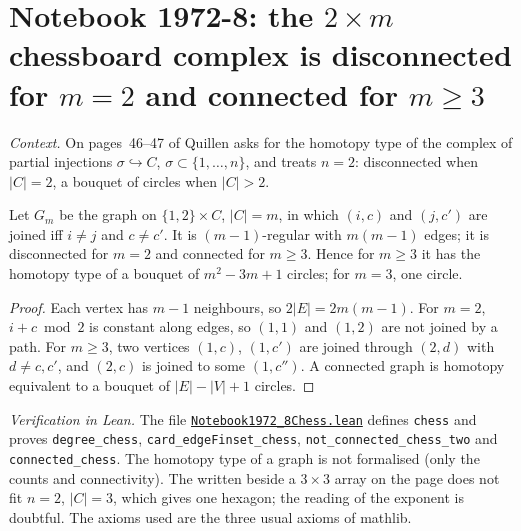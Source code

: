 \section[Notebook 1972-8: the $2 \times m$ chessboard complex]{Notebook 1972-8: the $2 \times m$ chessboard complex is disconnected for $m = 2$ and connected for $m \ge 3$\protect{}}\label{sec:quillen-1972-8-chess}

\emph{Context.} On pages~46--47 of  Quillen asks for the homotopy type of the complex of partial injections $\sigma \hookrightarrow C$, $\sigma \subset \{1, \dots, n\}$, and treats $n = 2$: disconnected when $|C| = 2$, a bouquet of circles when $|C| > 2$.

\begin{encadre}
\begin{theoreme}\label{thm:quillen-1972-8-chess}
Let $G_m$ be the graph on $\{1, 2\} \times C$, $|C| = m$, in which $(i, c)$ and $(j, c')$ are joined iff $i \ne j$ and $c \ne c'$. It is $(m - 1)$-regular with $m(m - 1)$ edges; it is disconnected for $m = 2$ and connected for $m \ge 3$. Hence for $m \ge 3$ it has the homotopy type of a bouquet of $m^2 - 3m + 1$ circles; for $m = 3$, one circle.
\end{theoreme}
\end{encadre}

\begin{proof}
Each vertex has $m - 1$ neighbours, so $2|E| = 2m(m - 1)$. For $m = 2$, $i + c \bmod 2$ is constant along edges, so $(1, 1)$ and $(1, 2)$ are not joined by a path. For $m \ge 3$, two vertices $(1, c)$, $(1, c')$ are joined through $(2, d)$ with $d \ne c, c'$, and $(2, c)$ is joined to some $(1, c'')$. A connected graph is homotopy equivalent to a bouquet of $|E| - |V| + 1$ circles.
\end{proof}

\emph{Verification in Lean.} The file \href{\leanblobmain/Notebook1972_8Chess.lean}{\texttt{Notebook1972\_8Chess.\allowbreak{}lean}} defines \texttt{chess} and proves \texttt{degree\_chess}, \texttt{card\_edgeFinset\_chess}, \texttt{not\_connected\_chess\_two} and \texttt{connected\_chess}. The homotopy type of a graph is not formalised (only the counts and connectivity). The  written beside a $3 \times 3$ array on the page does not fit $n = 2$, $|C| = 3$, which gives one hexagon; the reading of the exponent is doubtful. The axioms used are the three usual axioms of mathlib.

